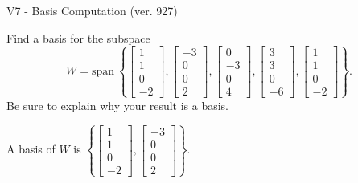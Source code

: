\begin{exercise}
  \begin{exerciseTitle}V7 - Basis Computation (ver. 927)\end{exerciseTitle}
  \begin{exerciseStatement}
    Find a basis for the subspace 
\[W=\mathrm{span}\ \left\{\left[\begin{array}{r}
1 \\
1 \\
0 \\
-2
\end{array}\right] , \left[\begin{array}{r}
-3 \\
0 \\
0 \\
2
\end{array}\right] , \left[\begin{array}{r}
0 \\
-3 \\
0 \\
4
\end{array}\right] , \left[\begin{array}{r}
3 \\
3 \\
0 \\
-6
\end{array}\right] , \left[\begin{array}{r}
1 \\
1 \\
0 \\
-2
\end{array}\right]\right\}.\]
 Be sure to explain why your result is a basis.


  \end{exerciseStatement}
  \begin{exerciseAnswer}
   A basis of \(W\) is  \(\left\{\left[\begin{array}{r}
1 \\
1 \\
0 \\
-2
\end{array}\right] , \left[\begin{array}{r}
-3 \\
0 \\
0 \\
2
\end{array}\right]\right\}\).
  


  \end{exerciseAnswer}
\end{exercise}